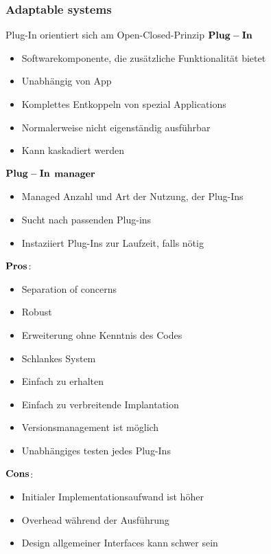  \subsubsection{Adaptable systems}
 Plug-In orientiert sich am Open-Closed-Prinzip
 $\bold{Plug-In}$
 \begin{itemize}
 	\item Softwarekomponente, die zusätzliche Funktionalität bietet
 	\item Unabhängig von App
 	\item Komplettes Entkoppeln von spezial Applications
 	\item Normalerweise nicht eigenständig ausführbar
 	\item Kann kaskadiert werden
 \end{itemize}
 $\bold{Plug-In}$ $\bold{manager}$
 \begin{itemize}
 	\item Managed Anzahl und Art der Nutzung, der Plug-Ins
 	\item Sucht nach passenden Plug-ins
 	\item Instaziiert Plug-Ins zur Laufzeit, falls nötig
 \end{itemize}
 \begin{multicols}{2}
 $\bold{Pros}$:
 \begin{itemize}
 	\item Separation of concerns
 	\item Robust
 	\item Erweiterung ohne Kenntnis des Codes
 	\item Schlankes System
 	\item Einfach zu erhalten
 	\item Einfach zu verbreitende Implantation
 	\item Versionsmanagement ist möglich
 	\item Unabhängiges testen jedes Plug-Ins
 \end{itemize}
 \columnbreak
 $\bold{Cons}$:
 \begin{itemize}
 	\item Initialer Implementationsaufwand ist höher
 	\item Overhead während der Ausführung
 	\item Design allgemeiner Interfaces kann schwer sein 
 \end{itemize}
 \end{multicols}
